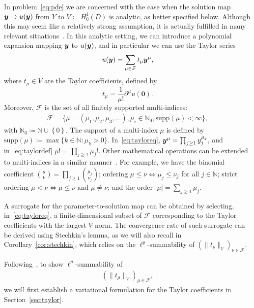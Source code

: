 In problem~\eqref{eq:pde} we are concerned with the case when the solution map ${\bm{y}} \mapsto u({\bm{y}})$ from $Y$ to $V\coloneqq H_0^1(D)$ is analytic, as better specified below.
Although this may seem like a relatively strong assumption, it is actually fulfilled in many relevant situations~\cite{chkifa2015}.
In this analytic setting, we can introduce a polynomial expansion mapping ${\bm{y}}$ to $u({\bm{y}})$, and in particular we can use the Taylor series
\begin{equation}
{u}({\bm{y}}) = \sum_{\mu\in\mathcal{F}} t_\mu {\bm{y}}^\mu, \label{eq:tayloreq}
\end{equation}
where $t_\mu \in V$ are the Taylor coefficients, defined by
\begin{equation}
	t_\mu = \frac{1}{\mu!}\partial^\mu {u}(\bm{0}).\label{eq:taylordef}
\end{equation}
Moreover, $\mathcal{F}$ is the set of all finitely supported multi-indices:
\begin{align*}
	\mathcal{F}=\{\mu=(\mu_1,\mu_2,\mu_3,\dots), \mu_i \in \mathbb{N}_0, \text{supp}(\mu) < \infty \},
\end{align*}
with $\mathbb{N}_0\coloneqq\mathbb{N}\cup \left\{0\right\}$.
The support of a multi-index $\mu$ is defined by $\text{supp}(\mu) \coloneqq \max\{k \in \mathbb{N}: \mu_k > 0\}$.
In~\eqref{eq:tayloreq}, ${\bm{y}}^\mu = \prod_{j\geq 1}y_j^{\mu_j}$, and in~\eqref{eq:taylordef} $\mu! = \prod_{j \geq 1} \mu_j!$.
Other mathematical operations can be extended to multi-indices in a similar manner~\cite{cohen2010}.
For example, we have the binomial coefficient $\binom{\mu }{ \nu} = \prod_{j \geq 1}\binom{\mu_j }{ \nu_j}$; ordering $\mu \leq \nu \iff \mu_j \leq  \nu_j $ for all $ j \in \mathbb{N}$; strict ordering $\mu < \nu \iff \mu \leq  \nu$ and $\mu \neq \nu$; and the order $|\mu| = \sum_{j \geq 1} \mu_j$.

A surrogate for the parameter-to-solution map can be obtained by selecting, in~\eqref{eq:tayloreq}, a finite-dimensional subset of $\mathcal{F}$ corresponding to the Taylor coefficients with the largest $V$-norm.
The convergence rate of such surrogate can be derived using Stechkin's lemma, as we will also recall in Corollary~\ref{cor:stechkin}, which relies on the $\ell^p$-summability of $(\|t_\nu\|_{V})_{\nu \in \mathcal{F}}$.

Following~\cite{bachmayr2017a}, to show $\ell^p$-summability of
\begin{align}
(\|t_\mu\|_{V})_{\mu \in \mathcal{F}}, \label{eq:taylorseq}
\end{align}
we will first establish a variational formulation for the Taylor coefficients in Section~\ref{sec:taylor}.

